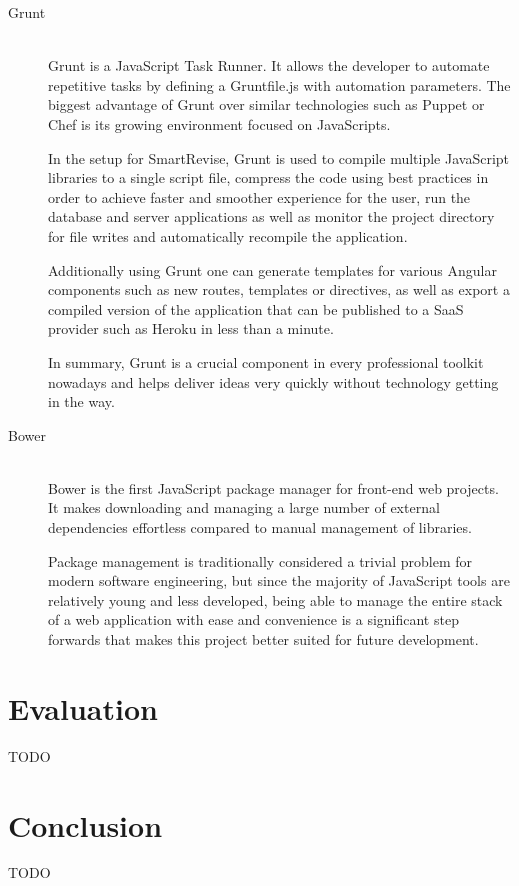 \documentclass[bsc,frontabs,twoside,singlespacing,parskip]{infthesis}     %
\begin{document}
		\begin{description}
			\item[Grunt] \hfill \\
			Grunt is a JavaScript Task Runner. It allows the developer to automate repetitive tasks by defining a Gruntfile.js with automation parameters. The biggest advantage of Grunt over similar technologies such as Puppet or Chef is its growing environment focused on JavaScripts.
			
			In the setup for SmartRevise, Grunt is used to compile multiple JavaScript libraries to a single script file, compress the code using best practices in order to achieve faster and smoother experience for the user, run the database and server applications as well as monitor the project directory for file writes and automatically recompile the application.
			
			Additionally using Grunt one can generate templates for various Angular components such as new routes, templates or directives, as well as export a compiled version of the application that can be published to a SaaS provider such as Heroku in less than a minute.
			
			In summary, Grunt is a crucial component in every professional toolkit nowadays and helps deliver ideas very quickly without technology getting in the way.
			
			\item[Bower] \hfill \\
			Bower is the first JavaScript package manager for front-end web projects. It makes downloading and managing a large number of external dependencies effortless compared to manual management of libraries. 
			
			Package management is traditionally considered a trivial problem for modern software engineering, but since the majority of JavaScript tools are relatively young and less developed, being able to manage the entire stack of a web application with ease and convenience is a significant step forwards that makes this project better suited for future development.
			
		\end{description}

\chapter{Evaluation}

	TODO

\chapter{Conclusion}

	TODO



\end{document}
